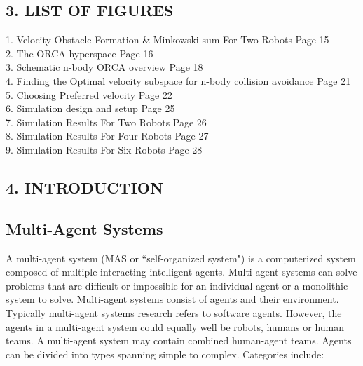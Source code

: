 \documentclass[12pt]{report}
\begin{document}
\tableofcontents
\begin{center}
\chapter*{3.  LIST OF FIGURES}
\end{center}
1. Velocity Obstacle Formation \& Minkowski sum For Two Robots \hspace{11mm} Page 15\\
2. The ORCA hyperspace \hspace{85mm} Page 16\\
3. Schematic n-body ORCA overview \hspace{64mm} Page 18\\
4. Finding the Optimal velocity subspace for n-body collision avoidance \hspace{2.4mm} Page 21\\
5. Choosing Preferred velocity \hspace{77mm} Page 22\\
6. Simulation design and setup \hspace{76mm} Page 25\\
7. Simulation Results For Two Robots \hspace{62mm} Page 26\\
8. Simulation Results For Four Robots \hspace{62mm} Page 27\\
9. Simulation Results For Six Robots \hspace{64mm} Page 28\\


\begin{center}
\chapter*{4.  INTRODUCTION}
\end{center}

\setcounter{chapter}{4}
\section{Multi-Agent Systems}
A multi-agent system (MAS or ``self-organized system") is a computerized system composed of multiple interacting intelligent agents. Multi-agent systems can solve problems that are difficult or impossible for an individual agent or a monolithic system to solve. 
Multi-agent systems consist of agents and their environment. Typically multi-agent systems research refers to software agents. However, the agents in a multi-agent system could equally well be robots, humans or human teams. A multi-agent system may contain combined human-agent teams. Agents can be divided into types spanning simple to complex. Categories include:
\end{document}
